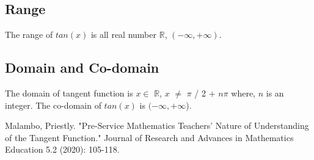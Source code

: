 \documentclass[letterpaper, 11pt]{report}
\begin{document}
 \subsection*{Range}
 \normalsize{ The range of $tan(x)$ is all real number $\mathbb{R}$, $(- \infty, + \infty)$. }
 
 \subsection*{Domain and Co-domain}
 \normalsize{The domain of tangent function is $x \in$ $\mathbb{R}$, $x$ $\neq$ $\pi$ / 2 $+$ $n \pi$ where, $n$ is an integer. The co-domain of $tan(x)$ is \((-\infty, +\infty\)).}
 
 
 \begin{thebibliography}{}
 
Malambo, Priestly. "Pre-Service Mathematics Teachers' Nature of Understanding of the Tangent Function." Journal of Research and Advances in Mathematics Education 5.2 (2020): 105-118.


\end{thebibliography}
 
 
 
 
\pagebreak
\end{document}
